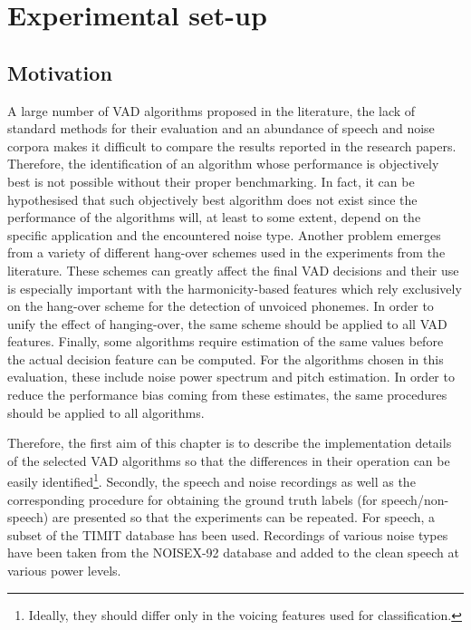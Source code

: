 
\chapter{Experimental set-up} %

\label{Chapter3} %



\section{Motivation}

A large number of VAD algorithms proposed in the literature, the lack of standard methods for their evaluation and an abundance of speech and noise corpora makes it difficult to compare the results reported in the research papers. Therefore, the identification of an algorithm whose performance is objectively best is not possible without their proper benchmarking. In fact, it can be hypothesised that such objectively best algorithm does not exist since the performance of the algorithms will, at least to some extent, depend on the specific application and the encountered noise type. Another problem emerges from a variety of different hang-over schemes used in the experiments from the literature. These schemes can greatly affect the final VAD decisions and their use is especially important with the harmonicity-based features which rely exclusively on the hang-over scheme for the detection of unvoiced phonemes. In order to unify the effect of hanging-over, the same scheme should be applied to all VAD features. Finally, some algorithms require estimation of the same values before the actual decision feature can be computed. For the algorithms chosen in this evaluation, these include noise power spectrum and pitch estimation. In order to reduce the performance bias coming from these estimates, the same procedures should be applied to all algorithms.

Therefore, the first aim of this chapter is to describe the implementation details of the selected VAD algorithms so that the differences in their operation can be easily identified\footnote{Ideally, they should differ only in the voicing features used for classification.}. Secondly, the speech and noise recordings as well as the corresponding procedure for obtaining the ground truth labels (for speech/non-speech) are presented so that the experiments can be repeated. For speech, a subset of the TIMIT \cite{TIMIT} database has been used. Recordings of various noise types have been taken from the NOISEX-92 \cite{NOISEX} database and added to the clean speech at various power levels.


